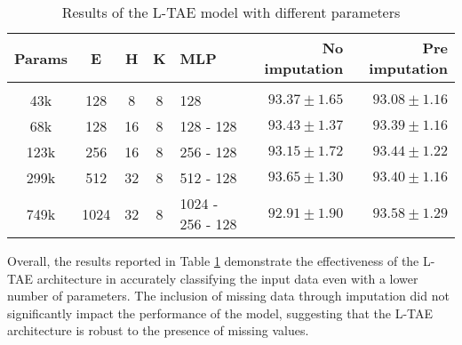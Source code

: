 \begin{table}[ht]
  \centering
  \begin{tabular}{cccclrr} 
     Params & E & H & K & MLP & No imputation & Pre imputation\\[0.2cm] 
     \hline \\[-0.2cm] 
     43k & 	128 & 	8 & 	8 & 	128 & 	$93.37 \pm 1.65$ & 	$93.08 \pm 1.16$\\ 
     68k & 	128 & 	16 & 	8 & 	128 - 128 & 	$93.43 \pm 1.37$ & 	$93.39 \pm 1.16$\\ 
     123k & 	256 & 	16 & 	8 & 	256 - 128 & 	$93.15 \pm 1.72$ & 	$93.44 \pm 1.22$\\ 
     299k & 	512 & 	32 & 	8 & 	512 - 128 & 	$\mathbf{93.65 \pm 1.30}$ & 	$93.40 \pm 1.16$\\ 
     749k & 	1024 & 	32 & 	8 & 	1024 - 256 - 128 & 	$92.91 \pm 1.90$ & 	$\mathbf{93.58 \pm 1.29}$\\ 
  \end{tabular}
  \caption{Results of the L-TAE model with different parameters}
  \label{tab:LTAEresults}
\end{table}

Overall, the results reported in Table \ref{tab:LTAEresults} demonstrate the effectiveness of the L-TAE architecture in accurately classifying the input data even with a lower number of parameters. The inclusion of missing data through imputation did not significantly impact the performance of the model, suggesting that the L-TAE architecture is robust to the presence of missing values.